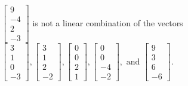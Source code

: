 \begin{exercise}
\begin{exerciseStatement}
  \end{exerciseStatement}
  \begin{exerciseAnswer}
   \(\left[\begin{array}{c}
9 \\
-4 \\
2 \\
-3
\end{array}\right]\) 
  	 is not  
	a linear combination of the vectors \(\left[\begin{array}{c}
3 \\
1 \\
0 \\
-3
\end{array}\right] , \left[\begin{array}{c}
3 \\
1 \\
2 \\
-2
\end{array}\right] , \left[\begin{array}{c}
0 \\
0 \\
2 \\
1
\end{array}\right] , \left[\begin{array}{c}
0 \\
0 \\
-4 \\
-2
\end{array}\right] , \text{ and } \left[\begin{array}{c}
9 \\
3 \\
6 \\
-6
\end{array}\right]\).

	
  


  \end{exerciseAnswer}
\end{exercise}